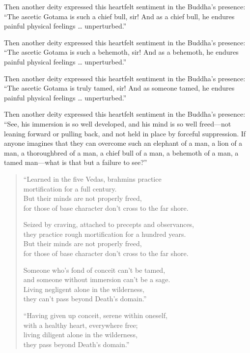 \documentclass[12pt,openany]{book}%
\begin{document}
Then another deity expressed this heartfelt sentiment in the Buddha’s presence: “The ascetic Gotama is such a chief bull, sir! And as a chief bull, he endures painful physical feelings … unperturbed.” 

Then another deity expressed this heartfelt sentiment in the Buddha’s presence: “The ascetic Gotama is such a behemoth, sir! And as a behemoth, he endures painful physical feelings … unperturbed.” 

Then another deity expressed this heartfelt sentiment in the Buddha’s presence: “The ascetic Gotama is truly tamed, sir! And as someone tamed, he endures painful physical feelings … unperturbed.” 

Then another deity expressed this heartfelt sentiment in the Buddha’s presence: “See, his immersion is so well developed, and his mind is so well freed—not leaning forward or pulling back, and not held in place by forceful suppression. If anyone imagines that they can overcome such an elephant of a man, a lion of a man, a thoroughbred of a man, a chief bull of a man, a behemoth of a man, a tamed man—what is that but a failure to see?” 

\begin{verse}%
“Learned in the five Vedas, brahmins practice \\
mortification for a full century. \\
But their minds are not properly freed, \\
for those of base character don’t cross to the far shore. 

Seized by craving, attached to precepts and observances, \\
they practice rough mortification for a hundred years. \\
But their minds are not properly freed, \\
for those of base character don’t cross to the far shore. 

Someone who’s fond of conceit can’t be tamed, \\
and someone without immersion can’t be a sage. \\
Living negligent alone in the wilderness, \\
they can’t pass beyond Death’s domain.” 

“Having given up conceit, serene within oneself, \\
with a healthy heart, everywhere free; \\
living diligent alone in the wilderness, \\
they pass beyond Death’s domain.” 

%
\end{verse}
\end{document}
